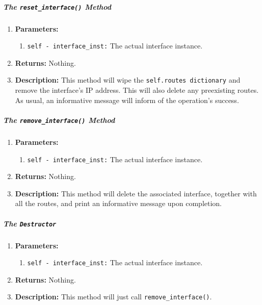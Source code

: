         \subparagraph{The \texttt{reset\_interface()} Method}
            \begin{enumerate}
                \item \textbf{Parameters:}
                \begin{enumerate}
                    \item \texttt{self - interface\_inst:} The actual interface instance.
                \end{enumerate}
                \item \textbf{Returns:} Nothing.
                \item \textbf{Description:} This method will wipe the \texttt{self.routes dictionary} and remove the interface's IP address. This will also delete any preexisting routes. As usual, an informative message will inform of the operation's success.
            \end{enumerate}

        \subparagraph{The \texttt{remove\_interface()} Method}
            \begin{enumerate}
                \item \textbf{Parameters:}
                \begin{enumerate}
                    \item \texttt{self - interface\_inst:} The actual interface instance.
                \end{enumerate}
                \item \textbf{Returns:} Nothing.
                \item \textbf{Description:} This method will delete the associated interface, together with all the routes, and print an informative message upon completion.
            \end{enumerate}

        \subparagraph{The \texttt{Destructor}}
            \begin{enumerate}
                \item \textbf{Parameters:}
                \begin{enumerate}
                    \item \texttt{self - interface\_inst:} The actual interface instance.
                \end{enumerate}
                \item \textbf{Returns:} Nothing.
                \item \textbf{Description:} This method will just call \texttt{remove\_interface()}.
            \end{enumerate}